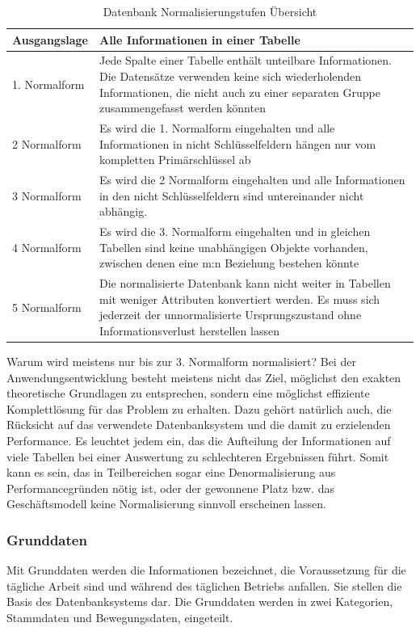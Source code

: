 \begin{table}[ht]
	\centering
		\begin{tabular}[h]{|p{}|p{}|}
		\hline
Ausgangslage & Alle Informationen in einer Tabelle \\
    \hline
1. Normalform & Jede Spalte einer Tabelle enthält unteilbare Informationen. Die Datensätze verwenden keine sich wiederholenden Informationen, die nicht auch zu einer separaten Gruppe zusammengefasst werden könnten \\
2 Normalform & Es wird die 1. Normalform eingehalten und alle Informationen in nicht Schlüsselfeldern hängen nur vom kompletten Primärschlüssel ab\\
3 Normalform & Es wird die 2 Normalform eingehalten und alle Informationen in den nicht Schlüsselfeldern sind untereinander nicht abhängig. \\
4 Normalform & Es wird die 3. Normalform eingehalten und in gleichen Tabellen sind keine unabhängigen Objekte vorhanden, zwischen denen eine m:n Beziehung bestehen könnte \\
5 Normalform & Die normalisierte Datenbank kann nicht weiter in Tabellen mit weniger Attributen konvertiert werden. Es muss sich jederzeit der unnormalisierte Ursprungszustand ohne Informationsverlust herstellen lassen \\
\hline
		\end{tabular}
	\caption{Datenbank Normalisierungstufen Übersicht}
	\label{tab:Normalisierung}
\end{table}

Warum wird meistens nur bis zur 3. Normalform normalisiert? Bei der Anwendungsentwicklung besteht meistens nicht das Ziel, möglichst den exakten theoretische Grundlagen zu entsprechen, sondern eine möglichst effiziente Komplettlösung für das Problem zu erhalten. Dazu gehört natürlich auch, die Rücksicht auf das verwendete Datenbanksystem und die damit zu erzielenden Performance. Es leuchtet jedem ein, das die Aufteilung der Informationen auf viele Tabellen bei einer Auswertung zu schlechteren Ergebnissen führt. Somit kann es sein, das in Teilbereichen sogar eine Denormalisierung aus Performancegründen nötig ist, oder der gewonnene Platz bzw. das Geschäftsmodell keine Normalisierung sinnvoll erscheinen lassen.

\subsubsection{Grunddaten}
Mit Grunddaten werden die Informationen bezeichnet, die Voraussetzung für die tägliche Arbeit sind und während des täglichen Betriebs anfallen. Sie stellen die Basis des Datenbanksystems dar. Die Grunddaten werden in zwei Kategorien, Stammdaten und Bewegungsdaten, eingeteilt.

